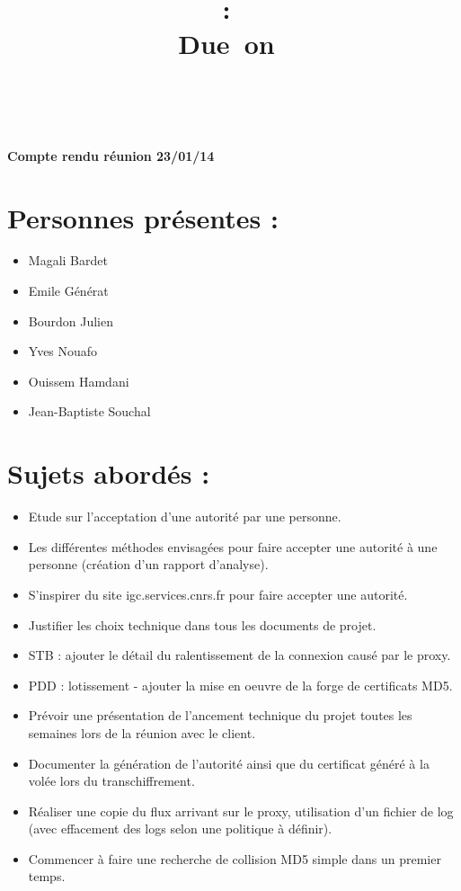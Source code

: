 \documentclass[a4paper,11pt,french]{article}
\title{
\vspace{2in}
\textmd{\textbf{\hmwkClass :\ \hmwkTitle}}\\
\normalsize\vspace{0.1in}\small{Due\ on\ \hmwkDueDate}\\
\vspace{0.1in}\large{\textit{\hmwkClassInstructor\ \hmwkClassTime}}
\vspace{3in}
}
\author{\hmwkAuthorName}
\date{} %
\newcommand{\hmwkDocName}{Compte rendu réunion 23/01/14} %
\begin{document}
\newcount\startdate
\newcount\daynum
\pagestyle{fancy}

\vspace*{5cm}
\begin{center}\textbf{\Huge{\hmwkDocName}}\end{center}
\vspace*{4.5cm}

\newpage




\section{Personnes présentes :}
\begin{itemize}
  \item Magali Bardet
  \item Emile Générat
  \item Bourdon Julien
  \item Yves Nouafo
  \item Ouissem Hamdani
  \item Jean-Baptiste Souchal
\end{itemize}

\section{Sujets abordés :}
\begin{itemize}
  \item Etude sur l'acceptation d'une autorité par une personne.
  \item Les différentes méthodes envisagées pour faire accepter une autorité à 
  une personne (création d'un rapport d'analyse).
  \item S'inspirer du site igc.services.cnrs.fr pour faire accepter une 
  autorité.
  \item Justifier les choix technique dans tous les documents de projet.
  \item STB : ajouter le détail du ralentissement de la connexion causé par le 
  proxy.
  \item PDD : lotissement - ajouter la mise en oeuvre de la forge de certificats 
  MD5.
  \item Prévoir une présentation de l'ancement technique du projet toutes les 
  semaines lors de la réunion avec le client.
  \item Documenter la génération de l'autorité ainsi que du certificat généré à 
  la volée lors du transchiffrement.
  \item Réaliser une copie du flux arrivant sur le proxy, utilisation d'un 
  fichier de log (avec effacement des logs selon une politique à définir).
  \item Commencer à faire une recherche de collision MD5 simple dans un premier 
  temps.
\end{itemize}
\end{document}
